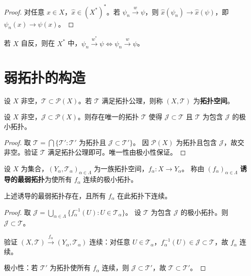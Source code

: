 \documentclass[lang=cn,a4paper,newtx,section]{elegantbook}
\begin{document}
\begin{proof}
  对任意 $x\in X$，$\hat{x}\in(X^*)^*$。若 $\psi_n\xrightarrow{w}\psi$，则 $\hat{x}(\psi_n)\to\hat{x}(\psi)$，即 $\psi_n(x)\to\psi(x)$。
\end{proof}

\begin{proposition}
  若 $X$ 自反，则在 $X^*$ 中，$\psi_n\xrightarrow{w^*}\psi\Longleftrightarrow\psi_n\xrightarrow{w}\psi$。
\end{proposition}

\section{弱拓扑的构造}

\begin{definition}[拓扑空间]
  设 $X$ 非空，$\mathcal{T}\subset\mathcal{P}(X)$。若 $\mathcal{T}$ 满足拓扑公理，则称 $(X,\mathcal{T})$ 为\textbf{拓扑空间}。
\end{definition}

\begin{proposition}
  设 $X$ 非空，$\mathcal{J}\subset\mathcal{P}(X)$。则存在唯一的拓扑 $\mathcal{T}$ 使得 $\mathcal{J}\subset\mathcal{T}$ 且 $\mathcal{T}$ 为包含 $\mathcal{J}$ 的极小拓扑。
\end{proposition}

\begin{proof}
  取 $\mathcal{T}=\bigcap\{\mathcal{T}':\mathcal{T}'\text{ 为拓扑且 }\mathcal{J}\subset\mathcal{T}'\}$。
  因 $\mathcal{P}(X)$ 为拓扑且包含 $\mathcal{J}$，故交非空。验证 $\mathcal{T}$ 满足拓扑公理即可。唯一性由极小性保证。
\end{proof}

\begin{definition}[诱导的最弱拓扑]
  设 $X$ 为集合，$(Y_\alpha,\mathcal{T}_\alpha)_{\alpha\in\Lambda}$ 为一族拓扑空间，$f_\alpha:X\to Y_\alpha$。
  称由 $(f_\alpha)_{\alpha\in\Lambda}$ \textbf{诱导的最弱拓扑}为使所有 $f_\alpha$ 连续的极小拓扑。
\end{definition}

\begin{proposition}
  上述诱导的最弱拓扑存在，且所有 $f_\alpha$ 在此拓扑下连续。
\end{proposition}

\begin{proof}
  取 $\mathcal{J}=\bigcup_{\alpha\in\Lambda}\{f_\alpha^{-1}(U):U\in\mathcal{T}_\alpha\}$。
  设 $\mathcal{T}$ 为包含 $\mathcal{J}$ 的极小拓扑。则 $\mathcal{J}\subset\mathcal{T}$。

  验证 $(X,\mathcal{T})\xrightarrow{f_\alpha}(Y_\alpha,\mathcal{T}_\alpha)$ 连续：对任意 $U\in\mathcal{T}_\alpha$，$f_\alpha^{-1}(U)\in\mathcal{J}\subset\mathcal{T}$，故 $f_\alpha$ 连续。

  极小性：若 $\mathcal{T}'$ 为拓扑使所有 $f_\alpha$ 连续，则 $\mathcal{J}\subset\mathcal{T}'$，故 $\mathcal{T}\subset\mathcal{T}'$。
\end{proof}
\end{document}
